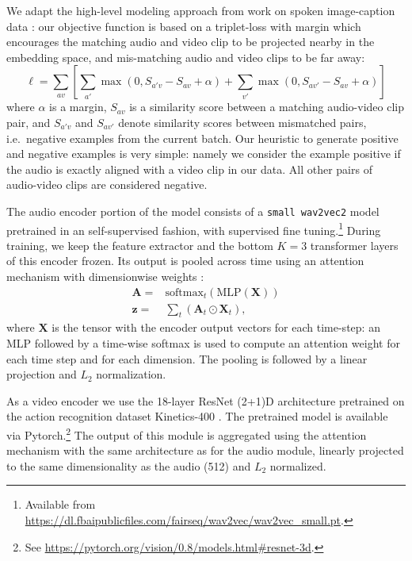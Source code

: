 We adapt the high-level modeling approach from work on spoken
image-caption data
\citep{harwath2016unsupervised,chrupala-etal-2017-representations}:
our objective function is based on a triplet-loss with margin which
encourages the matching audio and video clip to be projected nearby in
the embedding space, and mis-matching audio and video clips to be far
away:
\begin{equation}
  \ell = \sum_{av}\left[\sum_{a'} \max(0, S_{a'v} - S_{av} +
    \alpha) + \sum_{v'} \max(0, S_{av'} - S_{av} + \alpha) \right]
  \label{eq:triplet}
\end{equation}
where $\alpha$ is a margin, $S_{av}$ is a similarity score between a
matching audio-video clip pair, and $S_{a'v}$ and $S_{av'}$ denote
similarity scores between mismatched pairs, i.e.\ negative examples
from the current batch. Our heuristic to generate positive and
negative examples is very simple: namely we consider the example
positive if the audio is exactly aligned with a video clip in our
data. All other pairs of audio-video clips are considered negative.

The audio encoder portion of the model consists of a {\tt small
  wav2vec2} model \citep{wav2vec2} pretrained in an self-supervised
fashion, with supervised fine tuning.\footnote{Available from
  \url{https://dl.fbaipublicfiles.com/fairseq/wav2vec/wav2vec_small.pt}.}
During training, we keep the feature extractor and the bottom $K=3$
transformer layers of this encoder frozen. Its output is pooled across
time using an attention mechanism with dimensionwise weights
\citep{Merkx2019}:
\begin{equation}
  \begin{aligned}
    \mathbf{A} = & \mathrm{softmax}_t\left(\mathrm{MLP}(\mathbf{X})\right)\\
    \mathbf{z} = & \sum_t \left( \mathbf{A}_{t} \odot \mathbf{X}_{t} \right),
  \end{aligned}
  \label{eq:att-pool}
\end{equation}
where $\mathbf{X}$ is the tensor with the encoder output vectors for
each time-step: an MLP followed by a time-wise
softmax is used to compute an attention weight for each time step and for each
dimension.
The pooling is followed by a linear projection and $L_2$
normalization.

As a video encoder we use the 18-layer ResNet (2+1)D architecture
\citep{tran2018closer} pretrained on the action recognition dataset
Kinetics-400 \citep{DBLP:journals/corr/KayCSZHVVGBNSZ17}. The
pretrained model is available via Pytorch.\footnote{See
  \url{https://pytorch.org/vision/0.8/models.html\#resnet-3d}.}  The
output of this module is aggregated using the attention mechanism with
the same architecture as for the audio module, linearly projected to
the same dimensionality as the audio (512) and $L_2$ normalized.
